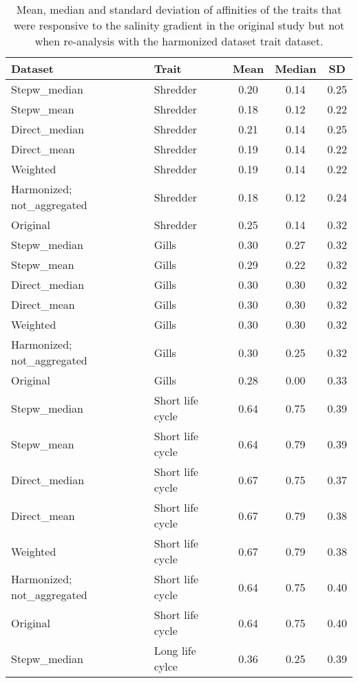 \documentclass[../Draft_harmonization_paper.tex]{subfiles}
\begin{document}
\begin{table}[ht]
    \centering
    \caption{Mean, median and standard deviation of affinities of the traits that were responsive to the salinity gradient in the original study but not when re-analysis with the harmonized dataset trait dataset.} 
    \label{tab:SI_resp_traits_summary_stats}
    \begin{tabular}{llccc}
    \toprule[.1em]
    Dataset & Trait & Mean & Median & SD \\ 
    \toprule[.1em]
    Stepw\_median & Shredder & 0.20 & 0.14 & 0.25 \\ 
      Stepw\_mean & Shredder & 0.18 & 0.12 & 0.22 \\ 
      Direct\_median & Shredder & 0.21 & 0.14 & 0.25 \\ 
      Direct\_mean & Shredder & 0.19 & 0.14 & 0.22 \\ 
      Weighted & Shredder & 0.19 & 0.14 & 0.22 \\ 
      Harmonized; not\_aggregated & Shredder & 0.18 & 0.12 & 0.24 \\ 
      Original & Shredder & 0.25 & 0.14 & 0.32 \\ 
      Stepw\_median & Gills & 0.30 & 0.27 & 0.32 \\ 
      Stepw\_mean & Gills & 0.29 & 0.22 & 0.32 \\ 
      Direct\_median & Gills & 0.30 & 0.30 & 0.32 \\ 
      Direct\_mean & Gills & 0.30 & 0.30 & 0.32 \\ 
      Weighted & Gills & 0.30 & 0.30 & 0.32 \\ 
      Harmonized; not\_aggregated & Gills & 0.30 & 0.25 & 0.32 \\ 
      Original & Gills & 0.28 & 0.00 & 0.33 \\ 
      Stepw\_median & Short life cycle & 0.64 & 0.75 & 0.39 \\ 
      Stepw\_mean & Short life cycle & 0.64 & 0.79 & 0.39 \\ 
      Direct\_median & Short life cycle & 0.67 & 0.75 & 0.37 \\ 
      Direct\_mean & Short life cycle & 0.67 & 0.79 & 0.38 \\ 
      Weighted & Short life cycle & 0.67 & 0.79 & 0.38 \\ 
      Harmonized; not\_aggregated & Short life cycle & 0.64 & 0.75 & 0.40 \\ 
      Original & Short life cycle & 0.64 & 0.75 & 0.40 \\ 
      Stepw\_median & Long life cylce & 0.36 & 0.25 & 0.39 \\ 

\end{tabular}
\end{table}
\end{document}
